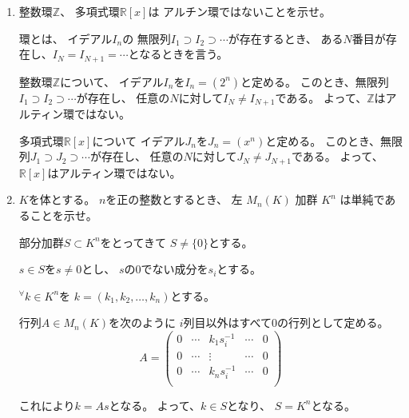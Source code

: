 \documentclass[12pt,b5paper]{ltjsarticle}
\begin{document}
\begin{enumerate}
      


      \hrulefill

 \item
      整数環$\mathbb{Z}$、
      多項式環$\mathbb{R}[x]$は
      アルチン環ではないことを示せ。

      \dotfill

      環とは、
      イデアル$I_{n}$の
      無限列$I_{1}\supset I_{2} \supset \cdots $が存在するとき、
      ある$N$番目が存在し、$I_{N}=I_{N+1}=\cdots$となるときを言う。

      整数環$\mathbb{Z}$について、
      イデアル$I_{n}$を$I_{n} = (2^{n})$と定める。
      このとき、無限列$I_{1}\supset I_{2} \supset \cdots$が存在し、
      任意の$N$に対して$I_{N}\ne I_{N+1}$である。
      よって、$\mathbb{Z}$はアルティン環ではない。

      多項式環$\mathbb{R}[x]$について
      イデアル$J_{n}$を$J_{n} = (x^{n})$と定める。
      このとき、無限列$J_{1}\supset J_{2} \supset \cdots$が存在し、
      任意の$N$に対して$J_{N}\ne J_{N+1}$である。
      よって、$\mathbb{R}[x]$はアルティン環ではない。

      \hrulefill

 \item
      $K$を体とする。
      $n$を正の整数とするとき、
      左 $M_{n}(K)$ 加群 $K^{n}$ は単純であることを示せ。



      \dotfill

      部分加群$S\subset K^{n}$をとってきて
      $S\ne \{0\}$とする。

      $s\in S$を$s\ne 0$とし、
      $s$の0でない成分を$s_{i}$とする。

      ${}^{\forall}k\in K^{n}$を
      $k=(k_{1},k_{2},\dots,k_{n})$とする。

      行列$A\in M_{n}(K)$を次のように
      $i$列目以外はすべて0の行列として定める。
      \begin{equation}
       A=
        \begin{pmatrix}
         0 & \cdots & k_{1}s_{i}^{-1} & \cdots & 0\\
         0 & \cdots & \vdots & \cdots & 0\\
         0 & \cdots & k_{n}s_{i}^{-1} & \cdots & 0\\
        \end{pmatrix}
      \end{equation}

      これにより$k = As$となる。
      よって、$k\in S$となり、
      $S=K^{n}$となる。


\end{enumerate}
\end{document}

